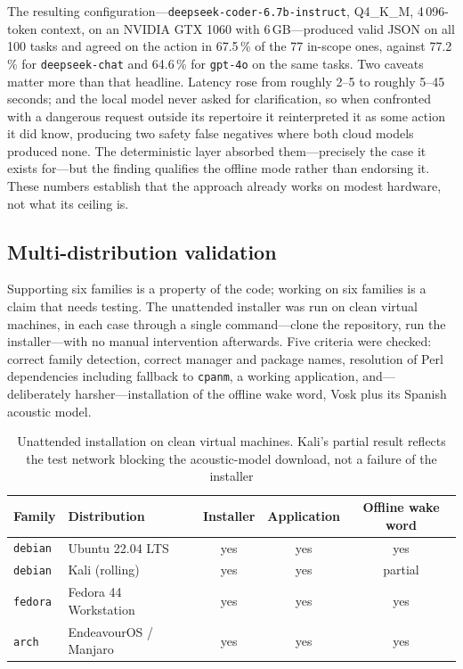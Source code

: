 \documentclass[10pt,a4paper]{article}
\begin{document}
The resulting configuration---\texttt{deepseek-coder-6.7b-instruct}, Q4\_K\_M, 4\,096-token context, on an NVIDIA GTX 1060 with 6\,GB---produced valid JSON on all 100 tasks and agreed on the action in 67.5\,\% of the 77 in-scope ones, against 77.2\,\% for \texttt{deepseek-chat} and 64.6\,\% for \texttt{gpt-4o} on the same tasks. Two caveats matter more than that headline. Latency rose from roughly 2--5 to roughly 5--45 seconds; and the local model never asked for clarification, so when confronted with a dangerous request outside its repertoire it reinterpreted it as some action it did know, producing two safety false negatives where both cloud models produced none. The deterministic layer absorbed them---precisely the case it exists for---but the finding qualifies the offline mode rather than endorsing it. These numbers establish that the approach already works on modest hardware, not what its ceiling is.

\subsection{Multi-distribution validation}
\label{subsec:res-distro}

Supporting six families is a property of the code; working on six families is a claim that needs testing. The unattended installer was run on clean virtual machines, in each case through a single command---clone the repository, run the installer---with no manual intervention afterwards. Five criteria were checked: correct family detection, correct manager and package names, resolution of Perl dependencies including fallback to \texttt{cpanm}, a working application, and---deliberately harsher---installation of the offline wake word, Vosk plus its Spanish acoustic model.

\begin{table}[!ht]
    \centering
    \caption{Unattended installation on clean virtual machines. Kali's partial result reflects the test network blocking the acoustic-model download, not a failure of the installer}
    \label{tab:distro-validation}
    \fontsize{9}{10.8}\selectfont
    \begin{tabular}{llccc}
        \toprule
        \textbf{Family} & \textbf{Distribution} & \textbf{Installer} & \textbf{Application} & \textbf{Offline wake word} \\
        \midrule
        \texttt{debian} & Ubuntu 22.04 LTS        & yes & yes & yes \\
        \texttt{debian} & Kali (rolling)          & yes & yes & partial \\
        \texttt{fedora} & Fedora 44 Workstation   & yes & yes & yes \\
        \texttt{arch}   & EndeavourOS / Manjaro   & yes & yes & yes \\
        \bottomrule
    \end{tabular}
\end{table}
\end{document}
